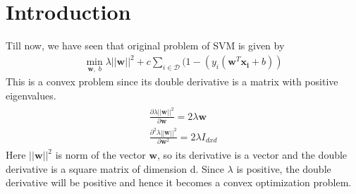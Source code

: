 \documentclass[12pt]{article}
\begin{document}
	\MakeScribeTop
\section{Introduction}
Till now, we have seen that original problem of SVM is given by
\begin{gather*}
    \min_{\boldsymbol{w},\; b} \lambda||\boldsymbol{w}||^2 + c\sum_{i \in \mathcal{D}}( 1 - (y_i(\boldsymbol{w}^T\boldsymbol{x_i}+b))
\end{gather*}
This is a convex problem since its double derivative is a matrix with positive eigenvalues. 
\begin{gather*}
    \begin{aligned}\frac{\partial \lambda||\boldsymbol{w}||^2 }{\partial \boldsymbol{w}}= 2 \lambda \boldsymbol{w} \\
    \frac{\partial ^2 \lambda||\boldsymbol{w}||^2 }{\partial \boldsymbol{w}^2}  = 2 \lambda I_{d x d}
     \end{aligned}
\end{gather*}
Here $||\boldsymbol{w}||^2$ is norm of the vector $\boldsymbol{w}$, so its derivative is a vector and the double derivative is a square matrix of dimension d.
Since $\lambda$ is positive, the double derivative will be positive and hence it becomes a convex optimization problem.
\end{document}
